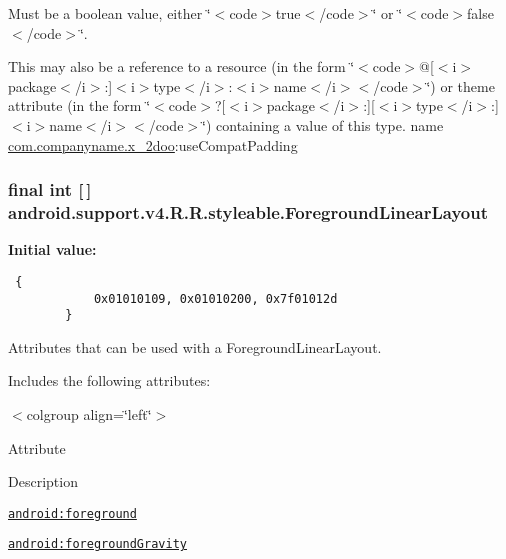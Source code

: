 Must be a boolean value, either \char`\"{}$<$code$>$true$<$/code$>$\char`\"{} or \char`\"{}$<$code$>$false$<$/code$>$\char`\"{}. 

This may also be a reference to a resource (in the form \char`\"{}$<$code$>$@\mbox{[}$<$i$>$package$<$/i$>$:\mbox{]}$<$i$>$type$<$/i$>$:$<$i$>$name$<$/i$>$$<$/code$>$\char`\"{}) or theme attribute (in the form \char`\"{}$<$code$>$?\mbox{[}$<$i$>$package$<$/i$>$:\mbox{]}\mbox{[}$<$i$>$type$<$/i$>$:\mbox{]}$<$i$>$name$<$/i$>$$<$/code$>$\char`\"{}) containing a value of this type.  name \hyperlink{namespacecom_1_1companyname_1_1x__2doo}{com.companyname.x\_\-2doo}:useCompatPadding \hypertarget{classandroid_1_1support_1_1v4_1_1_r_1_1styleable_bbe0a7c41b965e1656d09f3bc52b2751}{
\subsubsection[{ForegroundLinearLayout}]{\setlength{\rightskip}{0pt plus 5cm}final int \mbox{[}$\,$\mbox{]} android.support.v4.R.R.styleable.ForegroundLinearLayout}}
\label{classandroid_1_1support_1_1v4_1_1_r_1_1styleable_bbe0a7c41b965e1656d09f3bc52b2751}


\textbf{Initial value:}

\begin{Code}\begin{verbatim} {
            0x01010109, 0x01010200, 0x7f01012d
        }
\end{verbatim}
\end{Code}
Attributes that can be used with a ForegroundLinearLayout. 

Includes the following attributes: \begin{TabularC}{0}
\hline
\end{TabularC}
$<$colgroup align=\char`\"{}left\char`\"{}$>$ 

Attribute

Description 

{\tt \hyperlink{classandroid_1_1support_1_1v4_1_1_r_1_1styleable_07d1b8161309552e2bdeaabfe9a14379}{android:foreground}}

{\tt \hyperlink{classandroid_1_1support_1_1v4_1_1_r_1_1styleable_360249f2f1dfcbff7fbdc1596e41e43d}{android:foregroundGravity}}

